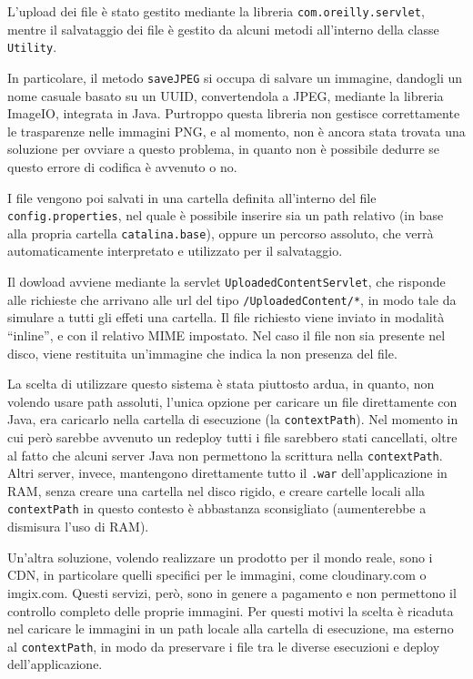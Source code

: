 L'upload dei file è stato gestito mediante la libreria \texttt{com.oreilly.servlet}, mentre il salvataggio dei file è gestito da alcuni metodi all'interno della classe \texttt{Utility}.

In particolare, il metodo \texttt{saveJPEG} si occupa di salvare un immagine, dandogli un nome casuale basato su un UUID, convertendola a JPEG, mediante la libreria ImageIO, integrata in Java.
Purtroppo questa libreria non gestisce correttamente le trasparenze nelle immagini PNG, e al momento, non è ancora stata trovata una soluzione per ovviare a questo problema, in quanto non è possibile dedurre se questo errore di codifica è avvenuto o no.

I file vengono poi salvati in una cartella definita all'interno del file \texttt{config.properties}, nel quale è possibile inserire sia un path relativo (in base alla propria cartella \texttt{catalina.base}), oppure un percorso assoluto, che verrà automaticamente interpretato e utilizzato per il salvataggio.

Il dowload avviene mediante la servlet \texttt{UploadedContentServlet}, che risponde alle richieste che arrivano alle url del tipo \texttt{/UploadedContent/*}, in modo tale da simulare a tutti gli effeti una cartella. Il file richiesto viene inviato in modalità ``inline'', e con il relativo MIME impostato. Nel caso il file non sia presente nel disco, viene restituita un'immagine che indica la non presenza del file.

La scelta di utilizzare questo sistema è stata piuttosto ardua, in quanto, non volendo usare path assoluti, l'unica opzione per caricare un file direttamente con Java, era caricarlo nella cartella di esecuzione (la \texttt{contextPath}). Nel momento in cui però sarebbe avvenuto un redeploy tutti i file sarebbero stati cancellati, oltre al fatto che alcuni server Java non permettono la scrittura nella \texttt{contextPath}. Altri server, invece, mantengono direttamente tutto il \texttt{.war} dell'applicazione in RAM, senza creare una cartella nel disco rigido, e creare cartelle locali alla \texttt{contextPath} in questo contesto è abbastanza sconsigliato (aumenterebbe a dismisura l'uso di RAM).

Un'altra soluzione, volendo realizzare un prodotto per il mondo reale, sono i CDN, in particolare quelli specifici per le immagini, come cloudinary.com o imgix.com. Questi servizi, però, sono in genere a pagamento e non permettono il controllo completo delle proprie immagini. Per questi motivi la scelta è ricaduta nel caricare le immagini in un path locale alla cartella di esecuzione, ma esterno al \texttt{contextPath}, in modo da preservare i file tra le diverse esecuzioni e deploy dell'applicazione.




